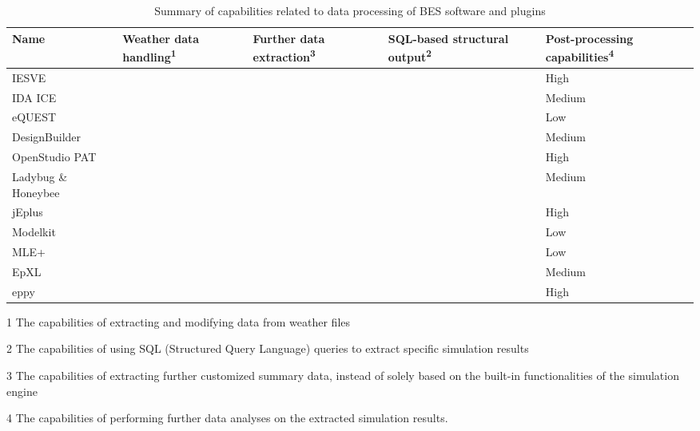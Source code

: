 \documentclass[3p, times]{elsarticle} %
\newcommand{\cmark}{\ding{51}}
\begin{document}
\setlength{\tabcolsep}{0.1pt}
\renewcommand{\arraystretch}{1.3}
\begin{table}[!h]

\begin{threeparttable}
\caption{\label{tab:data-sum}Summary of capabilities related to data processing of BES software and plugins}
\centering
\fontsize{7}{9}\selectfont
\begin{tabular}[t]{>{\raggedright\arraybackslash}p{3.3cm}>{\centering\arraybackslash}p{2.5cm}>{\centering\arraybackslash}p{2.5cm}>{\centering\arraybackslash}p{2.5cm}>{\centering\arraybackslash}p{2.5cm}}
\toprule
Name & Weather data handling\textsuperscript{1} & Further data extraction\textsuperscript{3} & SQL-based structural output\textsuperscript{2} & Post-processing capabilities\textsuperscript{4}\\
\midrule
IESVE \citep{IntegratedEnvironmentalSolutionsLimited2020} & \cmark & \cmark &  & High\\
IDA ICE \citep{Kalamees2004} &  & \cmark &  & Medium\\
eQUEST \citep{Hirsch2020} &  & \cmark &  & Low\\
DesignBuilder \citep{DesignBuilderSoftwareLtd2020a} &  & \cmark & \cmark & Medium\\
OpenStudio PAT \citep{Guglielmetti2011} & \cmark & \cmark & \cmark & High\\
Ladybug \& Honeybee \citep{Roudsari2013} & \cmark & \cmark &  & Medium\\
jEplus \citep{Yi2020} &  & \cmark & \cmark & High\\
Modelkit \citep{BigLadderSoftware2020} &  &  &  & Low\\
MLE+ \citep{Bernal2012} &  &  &  & Low\\
EpXL \citep{Schild2020} &  & \cmark &  & Medium\\
eppy \citep{Philip2020} &  & \cmark &  & High\\
\bottomrule
\end{tabular}
\begin{tablenotes}
\scriptsize
\item [1] The capabilities of extracting and modifying data from weather files
\item [2] The capabilities of using SQL (Structured Query Language) queries to extract specific simulation results
\item [3] The capabilities of extracting further customized summary data, instead of solely based on the built-in functionalities of the simulation engine
\item [4] The capabilities of performing further data analyses on the extracted simulation results.
\end{tablenotes}
\end{threeparttable}
\end{table}
\end{document}
